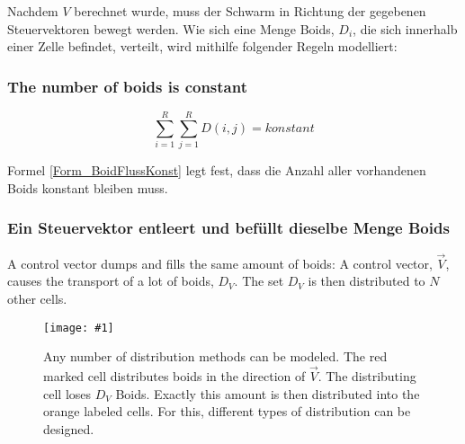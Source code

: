 \documentclass[a4paper, 10pt, journal]{wissarbIEEE}      %
\newcommand{\bild}[3]{
\begin{figure}[h]
\centering
  \texttt{[image: \#1]}
  \caption{#3}
  \label{#1}
\end{figure}}
\begin{document}

Nachdem $V$ berechnet wurde, muss der Schwarm in Richtung der gegebenen Steuervektoren bewegt werden. Wie sich eine Menge Boids, $D_i$, die sich innerhalb einer Zelle befindet, verteilt, wird mithilfe folgender Regeln modelliert:

\subsubsection{The number of boids is constant}


\begin{equation}
\sum_{i=1}^R \sum_{j=1}^R D(i,j)  = konstant
\label{Form_BoidFlussKonst}
\end{equation}

Formel \ref{Form_BoidFlussKonst} legt fest, dass die Anzahl aller vorhandenen Boids konstant bleiben muss.

\subsubsection{Ein Steuervektor entleert und befüllt dieselbe Menge Boids}
\label{subsubsec_D_V}


A control vector dumps and fills the same amount of boids: A control vector, $\vec{V}$, causes the transport of a lot of boids, $D_V$. The set $D_V$ is then distributed to $N$ other cells.

\bild{bilder/LeafEqEnter}{5cm}{Any number of distribution methods can be modeled. The red marked cell distributes boids in the direction of $\vec{V}$. The distributing cell loses $D_V$ Boids. Exactly this amount is then distributed into the orange labeled cells. For this, different types of distribution can be designed.
}
\end{document}
